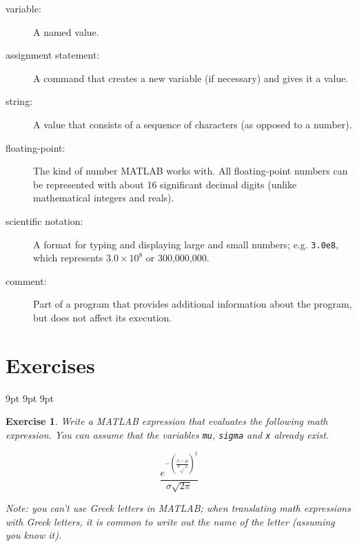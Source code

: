 \documentclass{book}
\begin{document}
\begin{description}
\item[variable:] A named value.   

\item[assignment statement:] A command that creates a new variable
(if necessary) and gives it a value.

\item[string:] A value that consists of a sequence of characters (as
opposed to a number). 

\item[floating-point:] The kind of number MATLAB works with.  All
floating-point numbers can be represented with about 16 significant
decimal digits (unlike mathematical integers and reals).

\item[scientific notation:] A format for typing and displaying large
and small numbers; e.g. {\tt 3.0e8}, which represents $3.0 \times 10^8$
or 300,000,000.  

\item[comment:] Part of a program that provides additional information
about the program, but does not affect its execution. 

\end{description}


\section{Exercises}

     {9pt}%
     {9pt}%
     {\itshape}%
     {}%
     {\bfseries}%
     {}%
     {9pt}%
     {}%


\theoremstyle{myex}
\newtheorem{ex}{Exercise}[chapter]

\begin{ex}
Write a MATLAB expression that evaluates the
following math expression.  You can assume that the variables
{\tt mu}, {\tt sigma} and {\tt x} already exist.

\begin{equation}
\frac{e^{- \left( \frac{x-\mu}{\sigma \sqrt{}2} \right) ^2}}
{\sigma \sqrt{2 \pi}}
\end{equation}

Note: you can't use Greek letters in MATLAB; when translating
math expressions with Greek letters, it is common to write out
the name of the letter (assuming you know it).
\end{ex}
\end{document}
